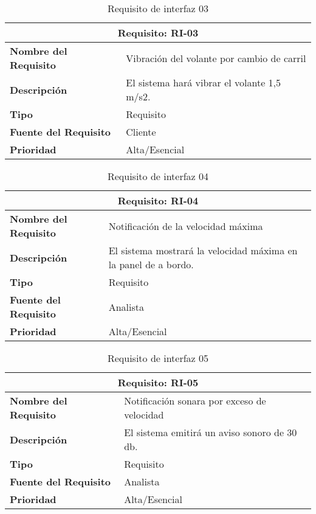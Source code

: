 \begin{table}[H]
\begin{center}
\begin{tabular}{p{} p{7cm}}
\multicolumn{2}{c}{\textbf{Requisito: RI-03} } \\
\hline \hline
\textbf{Nombre del Requisito} & Vibración del volante por cambio de carril\\
\hline
\textbf{Descripción} & El sistema hará vibrar el volante 1,5 m/s2. \\
\hline
\textbf{Tipo} & Requisito  \\
\hline
\textbf{Fuente del Requisito} & Cliente \\
\hline
\textbf{Prioridad} & Alta/Esencial  \\ \hline
\end{tabular}
\caption{Requisito de interfaz 03}
\label{tab:RI-03}
\end{center}
\end{table}

\begin{table}[H]
\begin{center}
\begin{tabular}{p{} p{7cm}}
\multicolumn{2}{c}{\textbf{Requisito: RI-04} } \\
\hline \hline
\textbf{Nombre del Requisito} & Notificación de la velocidad máxima\\
\hline
\textbf{Descripción} & El sistema mostrará la velocidad máxima en la panel de a bordo.\\
\hline
\textbf{Tipo} & Requisito  \\
\hline
\textbf{Fuente del Requisito} & Analista \\
\hline
\textbf{Prioridad} & Alta/Esencial  \\ \hline
\end{tabular}
\caption{Requisito de interfaz 04}
\label{tab:RI-04}
\end{center}
\end{table}

\begin{table}[H]
\begin{center}
\begin{tabular}{p{} p{7cm}}
\multicolumn{2}{c}{\textbf{Requisito: RI-05} } \\
\hline \hline
\textbf{Nombre del Requisito} & Notificación sonara por exceso de velocidad\\
\hline
\textbf{Descripción} & El sistema emitirá un aviso sonoro de 30 db. \\
\hline
\textbf{Tipo} & Requisito  \\
\hline
\textbf{Fuente del Requisito} & Analista \\
\hline
\textbf{Prioridad} & Alta/Esencial  \\ \hline
\end{tabular}
\caption{Requisito de interfaz 05}
\label{tab:RI-05}
\end{center}
\end{table}

